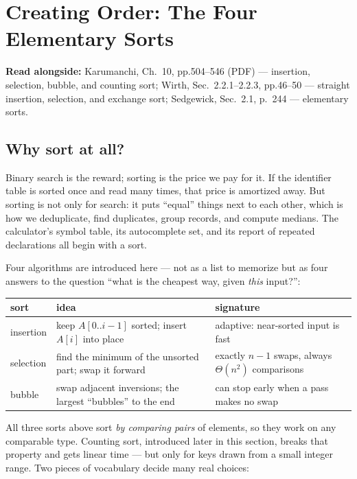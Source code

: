 \documentclass[11pt]{article}
\begin{document}
\section{Creating Order: The Four Elementary Sorts}

\textbf{Read alongside:} Karumanchi, Ch.~10, pp.504--546 (PDF) --- insertion, selection, bubble, and counting sort; Wirth, Sec.~2.2.1--2.2.3, pp.46--50 --- straight insertion, selection, and exchange sort; Sedgewick, Sec.~2.1, p.~244 --- elementary sorts.

\subsection{Why sort at all?}

Binary search is the reward; sorting is the price we pay for it. If the identifier table is sorted once and read many times, that price is amortized away. But sorting is not only for search: it puts ``equal'' things next to each other, which is how we deduplicate, find duplicates, group records, and compute medians. The calculator's symbol table, its autocomplete set, and its report of repeated declarations all begin with a sort.

Four algorithms are introduced here --- not as a list to memorize but as four answers to the question ``what is the cheapest way, given \emph{this} input?'':

\begin{center}
{\footnotesize
\begin{tabular}{p{2.6cm} p{4.6cm} p{4.6cm}}
  \toprule
  \textbf{sort} & \textbf{idea} & \textbf{signature} \\
  \midrule
  insertion & keep $A[0..i-1]$ sorted; insert $A[i]$ into place &
    adaptive: near-sorted input is fast \\
  selection & find the minimum of the unsorted part; swap it forward &
    exactly $n-1$ swaps, always $\Theta(n^2)$ comparisons \\
  bubble & swap adjacent inversions; the largest ``bubbles'' to the end &
    can stop early when a pass makes no swap \\
  \bottomrule
\end{tabular}}
\end{center}

All three sorts above sort \emph{by comparing pairs} of elements, so they work on any comparable type. Counting sort, introduced later in this section, breaks that property and gets linear time --- but only for keys drawn from a small integer range. Two pieces of vocabulary decide many real choices:
\end{document}
